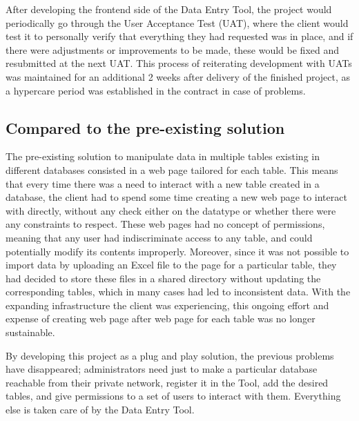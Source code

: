 After developing the frontend side of the Data Entry Tool, the project would periodically go through the User Acceptance Test (UAT), where the client would test it to personally verify that everything they had requested was in place, and if there were adjustments or improvements to be made, these would be fixed and resubmitted at the next UAT. This process of reiterating development with UATs was maintained for an additional 2 weeks after delivery of the finished project, as a hypercare period was established in the contract in case of problems.  


\subsection{Compared to the pre-existing solution}
The pre-existing solution to manipulate data in multiple tables existing in different databases consisted in a web page tailored for each table. This means that every time there was a need to interact with a new table created in a database, the client had to spend some time creating a new web page to interact with directly, without any check either on the datatype or whether there were any constraints to respect. These web pages had no concept of permissions, meaning that any user had indiscriminate access to any table, and could potentially modify its contents improperly. Moreover, since it was not possible to import data by uploading an Excel file to the page for a particular table, they had decided to store these files in a shared directory without updating the corresponding tables, which in many cases had led to inconsistent data.
With the expanding infrastructure the client was experiencing, this ongoing effort and expense of creating web page after web page for each table was no longer sustainable. 

By developing this project as a plug and play solution, the previous problems have disappeared; administrators need just to make a particular database reachable from their private network, register it in the Tool, add the desired tables, and give permissions to a set of users to interact with them. Everything else is taken care of by the Data Entry Tool.
    



